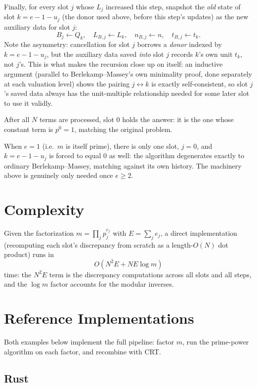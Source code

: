 \documentclass[11pt]{article}
\begin{document}
Finally, for every slot $j$ whose $L_j$ increased this step, snapshot the
\emph{old} state of slot $k = e-1-u_j$ (the donor used above, before this
step's updates) as the new auxiliary data for slot $j$:
\[
  B_j \leftarrow Q_k,\quad L_{B,j} \leftarrow L_k,\quad
  n_{B,j} \leftarrow n,\quad t_{B,j} \leftarrow t_k .
\]
Note the asymmetry: cancellation for slot $j$ borrows a \emph{donor}
indexed by $k = e-1-u_j$, but the auxiliary data saved \emph{into} slot $j$
records $k$'s own unit $t_k$, not $j$'s. This is what makes the recursion
close up on itself: an inductive argument (parallel to Berlekamp--Massey's
own minimality proof, done separately at each valuation level) shows the
pairing $j \leftrightarrow k$ is exactly self-consistent, so slot $j$'s
saved data always has the unit-multiple relationship needed for some later
slot to use it validly.

After all $N$ terms are processed, slot $0$ holds the answer: it is the one
whose constant term is $p^0 = 1$, matching the original problem.

\begin{notebox}
When $e = 1$ (i.e.\ $m$ is itself prime), there is only one slot, $j = 0$,
and $k = e - 1 - u_j$ is forced to equal $0$ as well: the algorithm
degenerates exactly to ordinary Berlekamp--Massey, matching against its own
history. The machinery above is genuinely only needed once $e \ge 2$.
\end{notebox}

\section{Complexity}
Given the factorization $m = \prod_j p_j^{e_j}$ with $E = \sum_j e_j$, a
direct implementation (recomputing each slot's discrepancy from scratch as a
length-$O(N)$ dot product) runs in
\[
  O\!\left(N^2 E + N E \log m\right)
\]
time: the $N^2 E$ term is the discrepancy computations across all slots and
all steps, and the $\log m$ factor accounts for the modular inverses.

\section{Reference Implementations}
Both examples below implement the full pipeline: factor $m$, run the
prime-power algorithm on each factor, and recombine with CRT.

\codenote
\subsection{Rust}
\end{document}
